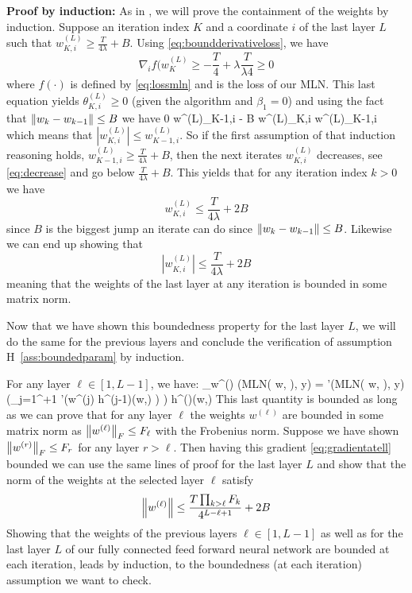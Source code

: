 \documentclass[11pt]{article}
\makeatletter
\renewenvironment{proof}[1][\proofname]{%
   \par\pushQED{\qed}\normalfont%
   \topsep6\p@\@plus6\p@\relax
   \trivlist\item[\hskip\labelsep\bfseries#1]%
   \ignorespaces
}{%
   \popQED\endtrivlist\@endpefalse
}
\theoremstyle{k}
\makeatother
\begin{document}
\begin{proof}
\textbf{Proof by induction:} As in \citep{defossez2020convergence}, we will prove the containment of the weights by induction.
Suppose an iteration index $K$ and a coordinate $i$ of the last layer $L$ such that $w^{(L)}_{K, i} \geq \frac{T}{4\lambda} + B$.
Using \eqref{eq:boundderivativeloss}, we have
$$
\nabla_i f(w^{(L)}_K\geq - \frac{T}{4} + \lambda \frac{T}{\lambda4} \geq 0
$$
where $f(\cdot)$ is defined by \eqref{eq:lossmln} and is the loss of our MLN.
This last equation yields $\theta^{(L)}_{K,i} \geq 0$ (given the algorithm and $\beta_1 = 0$) and using the fact that $\left\Vert w_k - w_{k-1} \right\Vert \leq B$ we have
\beq\label{eq:decrease}
0 \leq w^{(L)}_{K-1,i} - B \leq w^{(L)}_{K,i} \leq w^{(L)}_{K-1,i}
\eeq
which means that $| w^{(L)}_{K,i}| \leq w^{(L)}_{K-1,i}$.
So if the first assumption of that induction reasoning holds, \ie $w^{(L)}_{K-1, i} \geq \frac{T}{4\lambda} + B$, then the next iterates $w^{(L)}_{K, i}$ decreases, see \eqref{eq:decrease} and go below $\frac{T}{4\lambda} + B$. This yields that for any iteration index $k >0$ we have 
$$
w^{(L)}_{K, i} \leq \frac{T}{4\lambda} + 2B
$$
since $B$ is the biggest jump an iterate can do since $\left\Vert w_k - w_{k-1} \right\Vert \leq B$.
Likewise we can end up showing that 
$$
|w^{(L)}_{K, i}| \leq \frac{T}{4\lambda} + 2B
$$
meaning that the weights of the last layer at any iteration is bounded in some matrix norm.

Now that we have shown this boundedness property for the last layer $L$, we will do the same for the previous layers and conclude the verification of assumption H~\ref{ass:boundedparam} by induction.

For any layer $\ell \in [1, L-1]$, we have:
\beq\label{eq:gradientatell}
\nabla_{w^{(\ell)}}  (\textsf{MLN}( w, \xi), y)  =  '(\textsf{MLN}( w, \xi), y) \left(\prod_{j=1}^{\ell+1} \sigma'\left(w^{(j)} h^{(j-1)}(w,\xi) \right) \right) h^{()}(w,\xi) 
\eeq
This last quantity is bounded as long as we can prove that for any layer $\ell$ the weights $w^{(\ell)}$ are bounded in some matrix norm as $\left\Vert w^{(\ell)} \right\Vert_{F} \leq F_\ell$ with the Frobenius norm.
Suppose we have shown $\left\Vert w^{(r)} \right\Vert_{F} \leq F_r$ for any layer $r > \ell$. 
Then having this gradient \eqref{eq:gradientatell} bounded we can use the same lines of proof for the last layer $L$ and show that the norm of the weights at the selected layer $\ell$ satisfy
$$
\left\Vert w^{(\ell)} \right\Vert \leq \frac{T \prod_{k > \ell} F_k}{4^{L-\ell+1}} + 2B
$$
Showing that the weights of the previous layers $\ell \in [1, L-1]$ as well as for the last layer $L$ of our fully connected feed forward neural network are bounded at each iteration, leads by induction, to the boundedness (at each iteration) assumption we want to check.
\end{proof}

\end{document}
